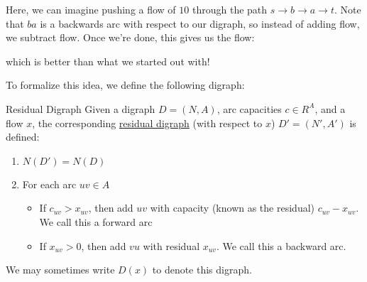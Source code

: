 \begin{enumerate}
    Here, we can imagine pushing a flow of $10$ through the path $s\rightarrow b\rightarrow a\rightarrow t$. Note that $ba$ is a backwards arc with respect to our digraph, so instead of adding flow, we subtract flow. Once we're done, this gives us the flow:

    \begin{minipage}{\textwidth}
        \centering
    \end{minipage}

    which is better than what we started out with!
\end{enumerate}

To formalize this idea, we define the following digraph:
\begin{definition}{Residual Digraph}{}
    Given a digraph $D = (N,A)$, arc capacities $c \in R^A$, and a flow $x$, the corresponding \underline{residual digraph} (with respect to $x$) $D' = (N', A')$ is defined:
    \begin{enumerate}
        \item $N(D') = N(D)$
        \item For each arc $uv \in A$
        \begin{itemize}
            \item If $c_{uv} > x_{uv}$, then add $uv$ with capacity (known as the residual) $c_{uv} - x_{uv}$. We call this a forward arc
            \item If $x_{uv} > 0$, then add $vu$ with residual $x_{uv}$. We call this a backward arc.
        \end{itemize}
    \end{enumerate}
    We may sometimes write $D(x)$ to denote this digraph.
\end{definition}

